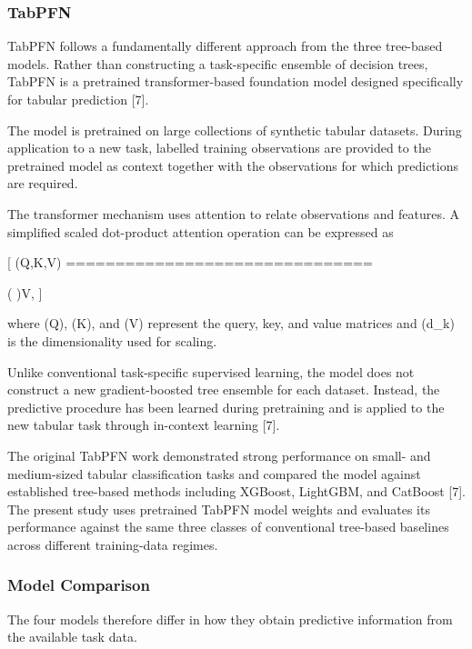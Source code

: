 \subsubsection{TabPFN}\label{tabpfn}

TabPFN follows a fundamentally different approach from the three tree-based models. Rather than constructing a task-specific ensemble of decision trees, TabPFN is a pretrained transformer-based foundation model designed specifically for tabular prediction {[}7{]}.

The model is pretrained on large collections of synthetic tabular datasets. During application to a new task, labelled training observations are provided to the pretrained model as context together with the observations for which predictions are required.

The transformer mechanism uses attention to relate observations and features. A simplified scaled dot-product attention operation can be expressed as

{[} (Q,K,V) ===============================


\left(  \right)V, {]}

where (Q), (K), and (V) represent the query, key, and value matrices and (d\_k) is the dimensionality used for scaling.

Unlike conventional task-specific supervised learning, the model does not construct a new gradient-boosted tree ensemble for each dataset. Instead, the predictive procedure has been learned during pretraining and is applied to the new tabular task through in-context learning {[}7{]}.

The original TabPFN work demonstrated strong performance on small- and medium-sized tabular classification tasks and compared the model against established tree-based methods including XGBoost, LightGBM, and CatBoost {[}7{]}. The present study uses pretrained TabPFN model weights and evaluates its performance against the same three classes of conventional tree-based baselines across different training-data regimes.

\subsubsection{Model Comparison}\label{model-comparison}

The four models therefore differ in how they obtain predictive information from the available task data.

